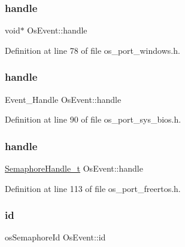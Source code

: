 \subsubsection{\texorpdfstring{handle}{handle}\hspace{0.1cm}{\footnotesize\ttfamily [1/3]}}
{\footnotesize\ttfamily void$\ast$ Os\+Event\+::handle}



Definition at line 78 of file os\+\_\+port\+\_\+windows.\+h.

\mbox{\label{structOsEvent_a27488f0b6374fe1217e12461193b9af0}} 
\subsubsection{\texorpdfstring{handle}{handle}\hspace{0.1cm}{\footnotesize\ttfamily [2/3]}}
{\footnotesize\ttfamily Event\+\_\+\+Handle Os\+Event\+::handle}



Definition at line 90 of file os\+\_\+port\+\_\+sys\+\_\+bios.\+h.

\mbox{\label{structOsEvent_a74866d5c892f4537896ffd435e055dcb}} 
\subsubsection{\texorpdfstring{handle}{handle}\hspace{0.1cm}{\footnotesize\ttfamily [3/3]}}
{\footnotesize\ttfamily \hyperlink{semphr_8h_ad88c6df4a04beedeac782918c8a332f5}{Semaphore\+Handle\+\_\+t} Os\+Event\+::handle}



Definition at line 113 of file os\+\_\+port\+\_\+freertos.\+h.

\mbox{\label{structOsEvent_a3444bc46bf8865f17612f50c9f355195}} 
\subsubsection{\texorpdfstring{id}{id}\hspace{0.1cm}{\footnotesize\ttfamily [1/2]}}
{\footnotesize\ttfamily os\+Semaphore\+Id Os\+Event\+::id}



